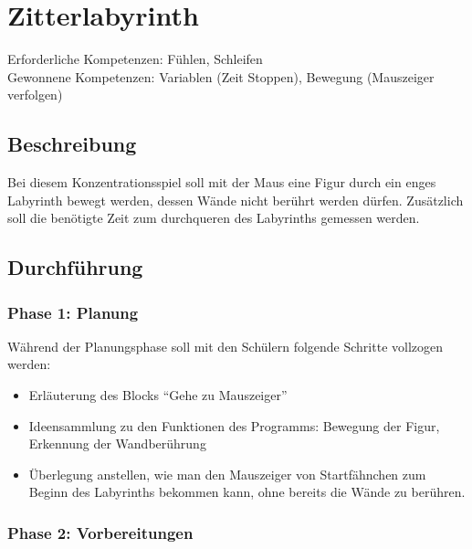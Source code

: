 \section{Zitterlabyrinth}\label{zitterlabyrinth}

Erforderliche Kompetenzen: Fühlen, Schleifen\\
Gewonnene Kompetenzen: Variablen (Zeit Stoppen), Bewegung (Mauszeiger
verfolgen)

\begin{figure}[ht]
    \centering 
    \caption[\Sectionname]{\Sectionname}
\end{figure}

\subsection{Beschreibung}\label{beschreibung}

Bei diesem Konzentrationsspiel soll mit der Maus eine Figur durch ein
enges Labyrinth bewegt werden, dessen Wände nicht berührt werden dürfen.
Zusätzlich soll die benötigte Zeit zum durchqueren des Labyrinths
gemessen werden.

\subsection{Durchführung}\label{durchfuxfchrung}

\subsubsection{Phase 1: Planung}\label{phase-1-planung}

Während der Planungsphase soll mit den Schülern folgende Schritte
vollzogen werden:

\begin{itemize}
\item
  Erläuterung des Blocks ``Gehe zu Mauszeiger''
\item
  Ideensammlung zu den Funktionen des Programms: Bewegung der Figur,
  Erkennung der Wandberührung
\item
  Überlegung anstellen, wie man den Mauszeiger von Startfähnchen zum
  Beginn des Labyrinths bekommen kann, ohne bereits die Wände zu
  berühren.
\end{itemize}

\subsubsection{Phase 2: Vorbereitungen}\label{phase-2-vorbereitungen}

